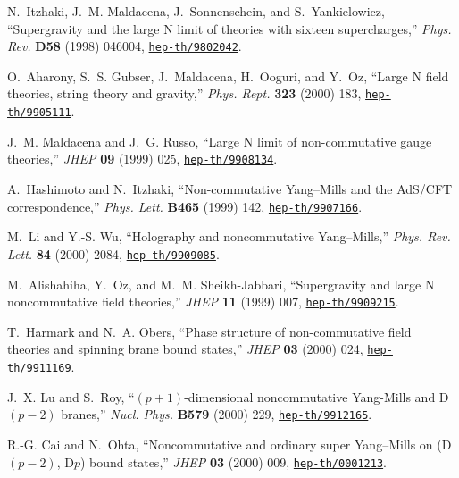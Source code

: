 \documentclass[a4paper,twoside,titlepage,12pt]{article}
\begin{document}
\begin{thebibliography}{10}
N.~Itzhaki, J.~M. Maldacena, J.~Sonnenschein, and S.~Yankielowicz,
  ``Supergravity and the large {N} limit of theories with sixteen
  supercharges,'' {\em Phys. Rev.} {\bf D58} (1998) 046004,
\href{http://www.arXiv.org/abs/hep-th/9802042}{{\tt hep-th/9802042}}.

O.~Aharony, S.~S. Gubser, J.~Maldacena, H.~Ooguri, and Y.~Oz, ``Large {N} field
  theories, string theory and gravity,'' {\em Phys. Rept.} {\bf 323} (2000)
  183,
\href{http://www.arXiv.org/abs/hep-th/9905111}{{\tt hep-th/9905111}}.

J.~M. Maldacena and J.~G. Russo, ``Large {N} limit of non-commutative gauge
  theories,'' {\em JHEP} {\bf 09} (1999) 025,
\href{http://www.arXiv.org/abs/hep-th/9908134}{{\tt hep-th/9908134}}.

A.~Hashimoto and N.~Itzhaki, ``Non-commutative {Yang--Mills} and the {AdS/CFT}
  correspondence,'' {\em Phys. Lett.} {\bf B465} (1999) 142,
\href{http://www.arXiv.org/abs/hep-th/9907166}{{\tt hep-th/9907166}}.

M.~Li and Y.-S. Wu, ``Holography and noncommutative {Yang--Mills},'' {\em Phys.
  Rev. Lett.} {\bf 84} (2000) 2084,
\href{http://www.arXiv.org/abs/hep-th/9909085}{{\tt hep-th/9909085}}.

M.~Alishahiha, Y.~Oz, and M.~M. Sheikh-Jabbari, ``Supergravity and large {N}
  noncommutative field theories,'' {\em JHEP} {\bf 11} (1999) 007,
\href{http://www.arXiv.org/abs/hep-th/9909215}{{\tt hep-th/9909215}}.

T.~Harmark and N.~A. Obers, ``Phase structure of non-commutative field theories
  and spinning brane bound states,'' {\em JHEP} {\bf 03} (2000) 024,
\href{http://www.arXiv.org/abs/hep-th/9911169}{{\tt hep-th/9911169}}.

J.~X. Lu and S.~Roy, ``$(p+1)$-dimensional noncommutative {Yang-Mills} and
  {D}$(p-2)$ branes,'' {\em Nucl. Phys.} {\bf B579} (2000) 229,
\href{http://www.arXiv.org/abs/hep-th/9912165}{{\tt hep-th/9912165}}.

R.-G. Cai and N.~Ohta, ``Noncommutative and ordinary super {Yang--Mills} on
  {(D$(p-2)$, D$p$)} bound states,'' {\em JHEP} {\bf 03} (2000) 009,
\href{http://www.arXiv.org/abs/hep-th/0001213}{{\tt hep-th/0001213}}.


\end{thebibliography}
\end{document}
